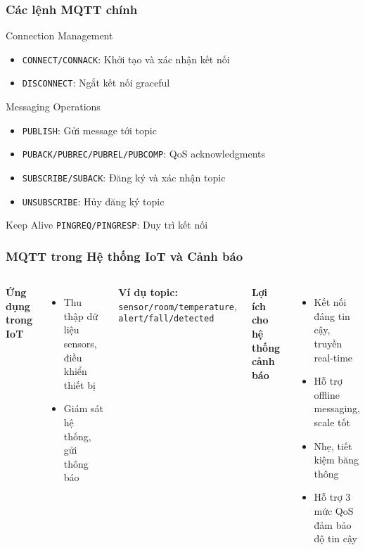 \begin{frame}
\frametitle{Các lệnh MQTT chính}

\begin{block}{Connection Management}
\begin{itemize}
\item \texttt{CONNECT/CONNACK}: Khởi tạo và xác nhận kết nối
\item \texttt{DISCONNECT}: Ngắt kết nối graceful
\end{itemize}
\end{block}

\begin{block}{Messaging Operations}
\begin{itemize}
\item \texttt{PUBLISH}: Gửi message tới topic
\item \texttt{PUBACK/PUBREC/PUBREL/PUBCOMP}: QoS acknowledgments
\item \texttt{SUBSCRIBE/SUBACK}: Đăng ký và xác nhận topic
\item \texttt{UNSUBSCRIBE}: Hủy đăng ký topic
\end{itemize}
\end{block}

\begin{block}{Keep Alive}
\texttt{PINGREQ/PINGRESP}: Duy trì kết nối
\end{block}

\end{frame}


\begin{frame}
\frametitle{MQTT trong Hệ thống IoT và Cảnh báo}

\begin{columns}[T]
    \textbf{Ứng dụng trong IoT}
    \begin{itemize}
        \item Thu thập dữ liệu sensors, điều khiển thiết bị
        \item Giám sát hệ thống, gửi thông báo
    \end{itemize}

    \textbf{Ví dụ topic:} \texttt{sensor/room/temperature}, \texttt{alert/fall/detected}

    \textbf{Lợi ích cho hệ thống cảnh báo}
    \begin{itemize}
        \item Kết nối đáng tin cậy, truyền real-time
        \item Hỗ trợ offline messaging, scale tốt
        \item Nhẹ, tiết kiệm băng thông
        \item Hỗ trợ 3 mức QoS đảm bảo độ tin cậy
    \end{itemize}
\end{columns}

\end{frame}

